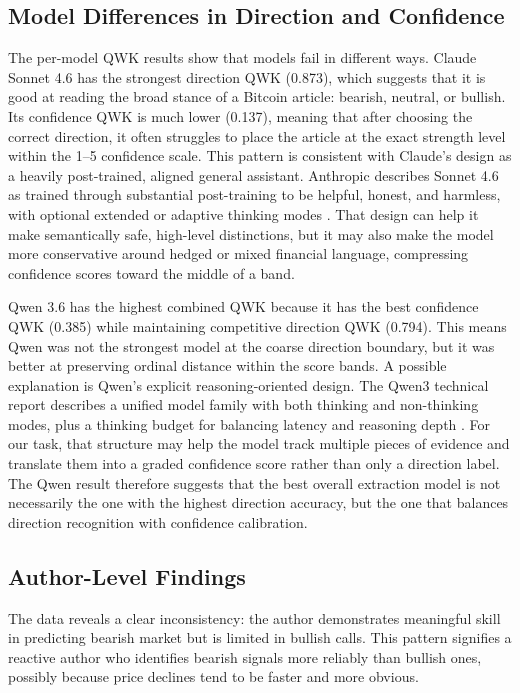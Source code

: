 \documentclass[sigconf,screen]{acmart}
\begin{document}
\subsection{Model Differences in Direction and Confidence}

The per-model QWK results show that models fail in different ways. Claude
Sonnet 4.6 has the strongest direction QWK (0.873), which suggests that it is
good at reading the broad stance of a Bitcoin article: bearish, neutral, or
bullish. Its confidence QWK is much lower (0.137), meaning that after choosing
the correct direction, it often struggles to place the article at the exact
strength level within the 1--5 confidence scale. This pattern is consistent
with Claude's design as a heavily post-trained, aligned general assistant.
Anthropic describes Sonnet 4.6 as trained through substantial post-training to
be helpful, honest, and harmless, with optional extended or adaptive thinking
modes \cite{anthropic2026claudesonnet46}. That design can help it make
semantically safe, high-level distinctions, but it may also make the model more
conservative around hedged or mixed financial language, compressing confidence
scores toward the middle of a band.

Qwen 3.6 has the highest combined QWK because it has the best confidence QWK
(0.385) while maintaining competitive direction QWK (0.794). This means Qwen
was not the strongest model at the coarse direction boundary, but it was better
at preserving ordinal distance within the score bands. A possible explanation
is Qwen's explicit reasoning-oriented design. The Qwen3 technical report
describes a unified model family with both thinking and non-thinking modes, plus
a thinking budget for balancing latency and reasoning depth
\cite{yang2025qwen3technicalreport}. For our task, that structure may help the
model track multiple pieces of evidence and translate them into a graded
confidence score rather than only a direction label. The Qwen result therefore
suggests that the best overall extraction model is not necessarily the one with
the highest direction accuracy, but the one that balances direction recognition
with confidence calibration.

\subsection{Author-Level Findings}
 
The data reveals a clear inconsistency: the author demonstrates meaningful skill in predicting bearish market but is limited in bullish calls. This pattern signifies a reactive author who identifies bearish signals more reliably than bullish ones, possibly because price declines tend to be faster and more obvious.
 
\end{document}
